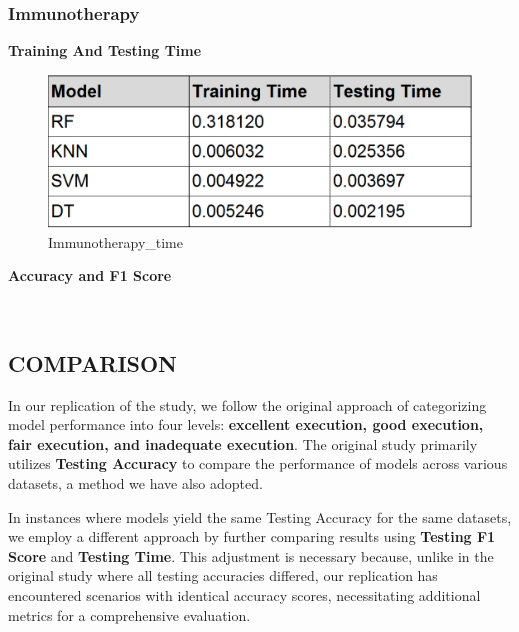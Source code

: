 \documentclass[11pt]{article}
\begin{document}
    \hypertarget{immunotherapy}{%
\subsubsection{Immunotherapy}\label{immunotherapy}}

    \textbf{Training And Testing Time}

    \begin{figure}
\centering
\includegraphics{images/Immunotherapy_time.PNG}
\caption{Immunotherapy\_time}
\end{figure}

    \textbf{Accuracy and F1 Score}

    \begin{center}
    \end{center}
    { \hspace*{\fill} \\}
    
    \hypertarget{comparison}{%
\subsection{COMPARISON}\label{comparison}}

    In our replication of the study, we follow the original approach of
categorizing model performance into four levels: \textbf{excellent
execution, good execution, fair execution, and inadequate execution}.
The original study primarily utilizes \textbf{Testing Accuracy} to
compare the performance of models across various datasets, a method we
have also adopted.

In instances where models yield the same Testing Accuracy for the same
datasets, we employ a different approach by further comparing results
using \textbf{Testing F1 Score} and \textbf{Testing Time}. This
adjustment is necessary because, unlike in the original study where all
testing accuracies differed, our replication has encountered scenarios
with identical accuracy scores, necessitating additional metrics for a
comprehensive evaluation.
\end{document}
